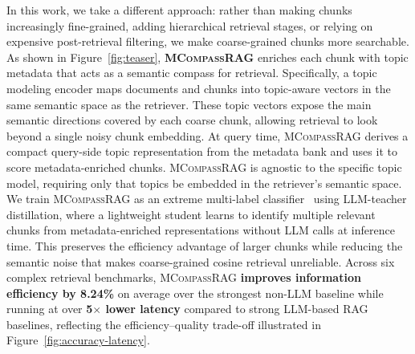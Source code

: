 \documentclass{llmxive}
\providecommand{\name}[1]{\textsc{MCompassRAG}\xspace}
\begin{document}
In this work, we take a different approach: rather than making chunks increasingly fine-grained, adding hierarchical retrieval stages, or relying on expensive post-retrieval filtering, we make coarse-grained chunks more searchable. As shown in Figure~\ref{fig:teaser}, \textbf{\name{}} enriches each chunk with topic metadata that acts as a semantic compass for retrieval. Specifically, a topic modeling encoder maps documents and chunks into topic-aware vectors in the same semantic space as the retriever. These topic vectors expose the main semantic directions covered by each coarse chunk, allowing retrieval to look beyond a single noisy chunk embedding. At query time, \name{} derives a compact query-side topic representation from the metadata bank and uses it to score metadata-enriched chunks. \name{} is agnostic to the specific topic model, requiring only that topics be embedded in the retriever's semantic space. We train \name{} as an extreme multi-label classifier~\cite{prabhu2025mogic} using LLM-teacher distillation, where a lightweight student learns to identify multiple relevant chunks from metadata-enriched representations without LLM calls at inference time. This preserves the efficiency advantage of larger chunks while reducing the semantic noise that makes coarse-grained cosine retrieval unreliable. Across six complex retrieval benchmarks, \name{} \textbf{improves information efficiency by 8.24\%} on average over the strongest non-LLM baseline while running at over \textbf{5$\times$ lower latency} compared to strong LLM-based RAG baselines, reflecting the efficiency--quality trade-off illustrated in Figure~\ref{fig:accuracy-latency}.

\end{document}

